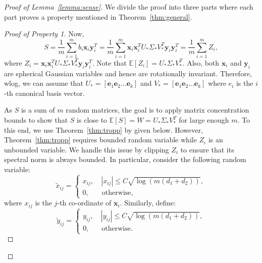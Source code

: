 \documentclass[11pt]{article}
\newcommand{\e}{\bm{e}}
\newcommand{\wt}[1]{\widetilde{#1}}
\newcommand{\tp}[1]{{#1}^{T}}
\newcommand{\E}{\mathbb{E}}
\newcommand{\Vo}{V_*}
\newcommand{\Vot}{\tp{V}_*}
\newcommand{\So}{\Sigma_*}
\newcommand{\Uo}{U_*}
\newcommand{\x}{\bm{x}}
\newcommand{\y}{\bm{y}}
\begin{document}
\begin{proof}[Proof of Lemma~\ref{lemma:sense}]
  We divide the proof into three parts where each part proves a property mentioned in Theorem~\ref{thm:general}. 
\begin{proof}[Proof of Property 1]
Now,
$$S=\frac{1}{m}\sum_{i=1}^m b_i \x_i \tp{\y}_i=\frac{1}{m}\sum_{i=1}^m \x_i\tp{\x}_i\Uo\So\tp{V}_*\y_i\tp{\y}_i=\frac{1}{m}\sum_{i=1}^m Z_i,$$
where $Z_i=\x_i\tp{\x}_i\Uo\So\Vot\y_i\y_i^T$. Note that $\mathbb{E}[Z_i]=\Uo\So\Vot$. Also, both $\x_i$ and $\y_i$ are spherical Gaussian variables and hence are rotationally invariant. Therefore, wlog, we can assume that $\Uo=[\e_1 \e_2 \dots \e_k]$ and $\Vo=[\e_1 \e_2 \dots \e_k]$ where $e_i$ is the $i$-th canonical basis vector. 

As $S$ is a sum of $m$ random matrices, the goal is to apply matrix concentration bounds to show that $S$ is close to $\E[S]=W=\Uo\So\Vot$ for large enough $m$. To this end, we use Theorem~\ref{thm:tropp} by \cite{Tropp11} given below. However, Theorem~\ref{thm:tropp} requires bounded random variable while $Z_i$ is an unbounded variable. We handle this issue by clipping $Z_i$ to ensure that its spectral norm is always bounded. In particular, consider the following random variable: 
\begin{equation}
  \label{eq:clipx}
  \wt{x}_{ij}= \begin{cases}x_{ij},& \ |x_{ij}|\leq C \sqrt{\log(m(d_1+d_2))},\\
0,&\text{ otherwise},\end{cases}\end{equation}
where $x_{ij}$ is the $j$-th co-ordinate of $\x_i$. Similarly, define: 
\begin{equation}\label{eq:clipy}
  \wt{y}_{ij}= \begin{cases}y_{ij},& \ |y_{ij}|\leq C \sqrt{\log(m(d_1+d_2))},\\
0,&\text{ otherwise}.\end{cases}
\end{equation}

\end{proof}
\end{proof}
\end{document}

